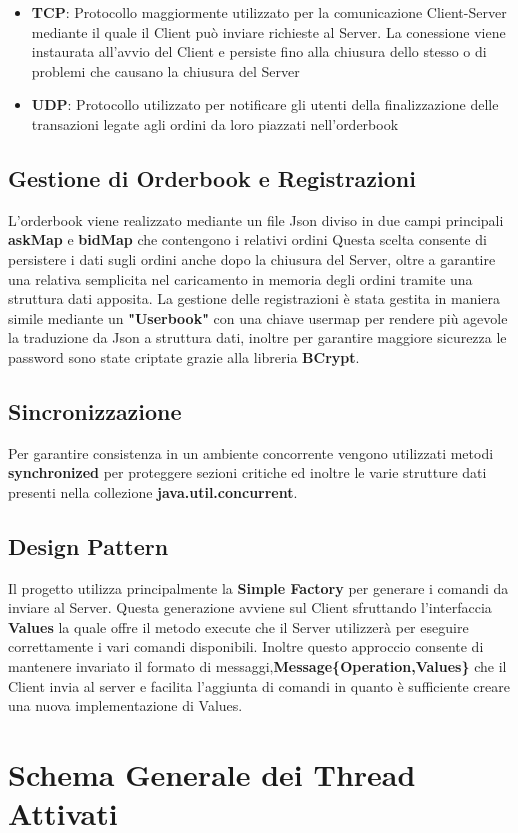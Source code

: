 \documentclass{article}
\begin{document}
\begin{itemize}
    \item \textbf{TCP}: Protocollo maggiormente utilizzato per la comunicazione Client-Server mediante il quale il Client può inviare richieste al Server. La conessione viene instaurata all'avvio del Client e persiste fino alla chiusura dello stesso o di problemi che causano la chiusura del Server
    \item \textbf{UDP}: Protocollo utilizzato per notificare gli utenti della finalizzazione delle transazioni legate agli ordini da loro piazzati nell'orderbook
\end{itemize}

\subsection{Gestione di Orderbook e Registrazioni}
L'orderbook viene realizzato mediante un file Json diviso in due campi principali \textbf{askMap} e \textbf{bidMap} che contengono i relativi ordini
Questa scelta consente di persistere i dati sugli ordini anche dopo la chiusura del Server, oltre a garantire una relativa semplicita nel caricamento in memoria degli ordini tramite una struttura dati apposita.
La gestione delle registrazioni è stata gestita in maniera simile mediante un \textbf{"Userbook"} con una chiave usermap per rendere più agevole la traduzione da Json a struttura dati, inoltre per garantire maggiore sicurezza le password sono state criptate grazie alla libreria \textbf{BCrypt}.

\subsection{Sincronizzazione}
Per garantire consistenza in un ambiente concorrente vengono utilizzati metodi \textbf{synchronized} per proteggere sezioni critiche ed inoltre le varie strutture dati presenti nella collezione \textbf{java.util.concurrent}.

\subsection{Design Pattern}
Il progetto utilizza principalmente la \textbf{Simple Factory} per generare i comandi da inviare al Server.
Questa generazione avviene sul Client sfruttando l'interfaccia \textbf{Values} la quale offre il metodo execute che il Server utilizzerà per eseguire correttamente i vari comandi disponibili. Inoltre questo approccio consente di mantenere invariato il formato di messaggi,\textbf{Message\{Operation,Values\}} che il Client invia al server e facilita l'aggiunta di comandi in quanto è sufficiente creare una nuova implementazione di Values.

\section{Schema Generale dei Thread Attivati}
\end{document}
